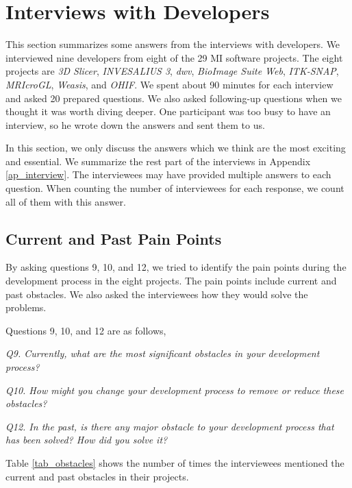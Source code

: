 \chapter{Interviews with Developers}
\label{ch_interview}

This section summarizes some answers from the interviews with developers. We interviewed nine developers from eight of the 29 MI software projects. The eight projects are \textit{3D Slicer}, \textit{INVESALIUS 3}, \textit{dwv}, \textit{BioImage Suite Web}, \textit{ITK-SNAP}, \textit{MRIcroGL}, \textit{Weasis}, and \textit{OHIF}. We spent about 90 minutes for each interview and asked 20 prepared questions. We also asked following-up questions when we thought it was worth diving deeper. One participant was too busy to have an interview, so he wrote down the answers and sent them to us.

In this section, we only discuss the answers which we think are the most exciting and essential. We summarize the rest part of the interviews in Appendix \ref{ap_interview}. The interviewees may have provided multiple answers to each question. When counting the number of interviewees for each response, we count all of them with this answer.

\section{Current and Past Pain Points}

By asking questions 9, 10, and 12, we tried to identify the pain points during the development process in the eight projects. The pain points include current and past obstacles. We also asked the interviewees how they would solve the problems.

Questions 9, 10, and 12 are as follows,

\textit{Q9. Currently, what are the most significant obstacles in your development process?}

\textit{Q10. How might you change your development process to remove or reduce these obstacles?}

\textit{Q12. In the past, is there any major obstacle to your development process that has been solved? How did you solve it?}

Table \ref{tab_obstacles} shows the number of times the interviewees mentioned the current and past obstacles in their projects.

